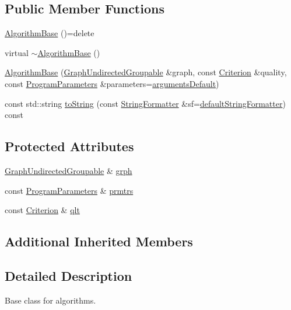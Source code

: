 \subsection*{Public Member Functions}
\begin{DoxyCompactItemize}
\item 
\hyperlink{classAlgorithmBase_ac498e7949995484bd5a9a3188c599edf}{Algorithm\+Base} ()=delete
\item 
virtual \hyperlink{classAlgorithmBase_a01862a2fa8e29b154e6d95c1287a598e}{$\sim$\+Algorithm\+Base} ()
\item 
\hyperlink{classAlgorithmBase_aaeeeef264fa7bae05fd3663a5b8c1302}{Algorithm\+Base} (\hyperlink{classGraphUndirectedGroupable}{Graph\+Undirected\+Groupable} \&graph, const \hyperlink{classCriterion}{Criterion} \&quality, const \hyperlink{structProgramParameters}{Program\+Parameters} \&parameters=\hyperlink{program_8h_ae2d819404495f80f31db7676c1329d19}{arguments\+Default})
\item 
const std\+::string \hyperlink{classAlgorithmBase_a3041a5aebcf04f8fd8f985fd23525406}{to\+String} (const \hyperlink{classStringFormatter}{String\+Formatter} \&sf=\hyperlink{stringFormatter_8h_abf1349c8e24162d0134072aff288f2a2}{default\+String\+Formatter}) const
\end{DoxyCompactItemize}
\subsection*{Protected Attributes}
\begin{DoxyCompactItemize}
\item 
\hyperlink{classGraphUndirectedGroupable}{Graph\+Undirected\+Groupable} \& \hyperlink{classAlgorithmBase_a54b71b720b025291d9802e20874c860d}{grph}
\item 
const \hyperlink{structProgramParameters}{Program\+Parameters} \& \hyperlink{classAlgorithmBase_a69765034d365e4cab46c25ec626db528}{prmtrs}
\item 
const \hyperlink{classCriterion}{Criterion} \& \hyperlink{classAlgorithmBase_aa1e529eb903df296a7a7ef67f06537d8}{qlt}
\end{DoxyCompactItemize}
\subsection*{Additional Inherited Members}


\subsection{Detailed Description}
Base class for algorithms. 

